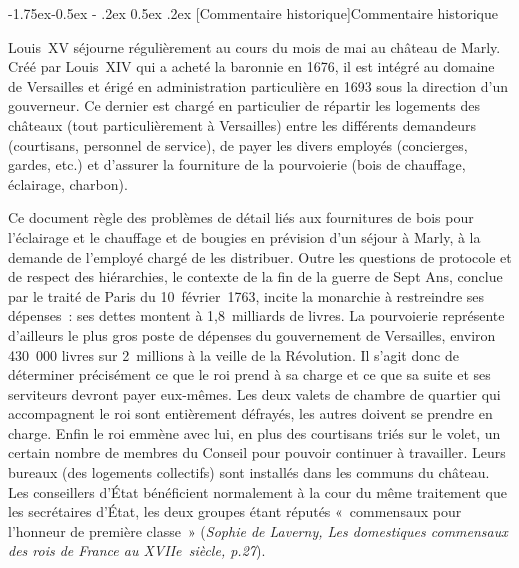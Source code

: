 \documentclass[11pt,twoside]{article}\makeatletter
\makeatletter
\renewcommand\subsection{\@startsection{subsection}{2}{\z@}%
     {-1.75ex\@plus -0.5ex \@minus- .2ex}%
     {0.5ex \@plus .2ex}%
     {\reset@font\Large\sffamily}}
\makeatother
\begin{document}
\subsection[{Commentaire historique}]{Commentaire historique}\par
Louis XV séjourne régulièrement au cours du mois de mai au château de Marly. Créé par Louis XIV qui a acheté la baronnie en 1676, il est intégré au domaine de Versailles et érigé en administration particulière en 1693 sous la direction d’un gouverneur. Ce dernier est chargé en particulier de répartir les logements des châteaux (tout particulièrement à Versailles) entre les différents demandeurs (courtisans, personnel de service), de payer les divers employés (concierges, gardes, etc.) et d’assurer la fourniture de la pourvoierie (bois de chauffage, éclairage, charbon). \par
Ce document règle des problèmes de détail liés aux fournitures de bois pour l’éclairage et le chauffage et de bougies en prévision d’un séjour à Marly, à la demande de l’employé chargé de les distribuer. Outre les questions de protocole et de respect des hiérarchies, le contexte de la fin de la guerre de Sept Ans, conclue par le traité de Paris du 10 février 1763, incite la monarchie à restreindre ses dépenses : ses dettes montent à 1,8 milliards de livres. La pourvoierie représente d’ailleurs le plus gros poste de dépenses du gouvernement de Versailles, environ 430 000 livres sur 2 millions à la veille de la Révolution. Il s’agit donc de déterminer précisément ce que le roi prend à sa charge et ce que sa suite et ses serviteurs devront payer eux-mêmes. Les deux valets de chambre de quartier qui accompagnent le roi sont entièrement défrayés, les autres doivent se prendre en charge. Enfin le roi emmène avec lui, en plus des courtisans triés sur le volet, un certain nombre de membres du Conseil pour pouvoir continuer à travailler. Leurs bureaux (des logements collectifs) sont installés dans les communs du château. Les conseillers d’État bénéficient normalement à la cour du même traitement que les secrétaires d’État, les deux groupes étant réputés « commensaux pour l’honneur de première classe » (\textit{Sophie de Laverny, Les domestiques commensaux des rois de France au XVIIe siècle, p.27}).
\end{document}
